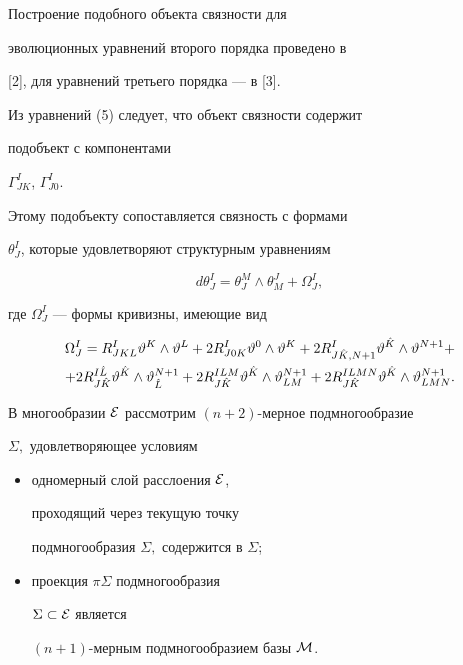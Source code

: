 Построение подобного объекта связности для 


эволюционных уравнений второго порядка проведено в


[2], для уравнений третьего порядка --- в [3].





Из уравнений (5) следует, что объект связности содержит 


подобъект с компонентами


$\Gamma^I_{JK}$, $\Gamma^I_{J0}.$


Этому подобъекту сопоставляется связность с формами


$\theta^I_J$, которые удовлетворяют структурным уравнениям


$$


d\theta^I_J=\theta^M_J\wedge\theta^J_M+\Omega^I_J,


$$


где $\Omega^I_J$ --- формы кривизны, имеющие вид


\begin{multline*}


\Omega^I_J=R^I_{JKL}\vartheta^K\wedge\vartheta^L+2R^I_{J0K}


\vartheta^0\wedge\vartheta^K+


2R^I_{J\Hat{K},N+1}\vartheta^{\Hat{K}}\wedge\vartheta^{N+1}+ \\


%


+ 2R^{I\Hat{L}}_{J\Hat{K}}\vartheta^{\Hat


K}\wedge\vartheta_{\Hat{L}}^{N+1}+2R^{ILM}_{J\Hat{K}}


\vartheta^{\Hat{K}}\wedge\vartheta^{N+1}_{LM}+


2R^{ILMN}_{J\Hat{K}}\vartheta^{\Hat{K}}\wedge\vartheta^{N+1}_{LMN}.


\end{multline*}





В многообразии $\cal E$ рассмотрим $(n+2)$-мерное подмногообразие


$\Sigma,$ удовлетворяющее условиям


\begin{itemize}


\item[(а)] одномерный слой расслоения $\cal E$,


проходящий через текущую точку


подмногообразия $\Sigma,$ содержится в $\Sigma$;


\item[(б)] проекция $\pi\Sigma$ подмногообразия


$\Sigma\subset \cal E$ является


$(n+1)$-мерным подмногообразием базы $\cal M$.


\end{itemize}





